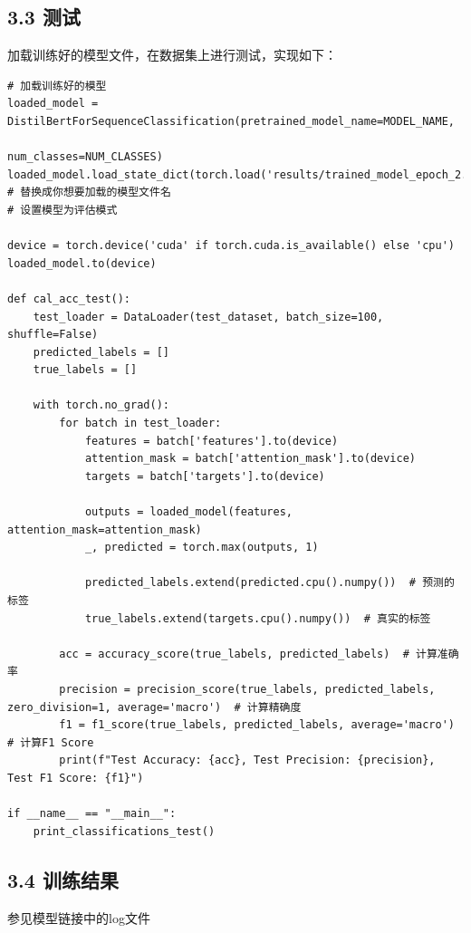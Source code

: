 \documentclass{article}
\begin{document}
\subsection*{3.3 测试}
加载训练好的模型文件，在数据集上进行测试，实现如下：
\begin{lstlisting}[style=Style]
# 加载训练好的模型
loaded_model = DistilBertForSequenceClassification(pretrained_model_name=MODEL_NAME,
                                                   num_classes=NUM_CLASSES)
loaded_model.load_state_dict(torch.load('results/trained_model_epoch_2.pth')) # 替换成你想要加载的模型文件名
# 设置模型为评估模式

device = torch.device('cuda' if torch.cuda.is_available() else 'cpu')
loaded_model.to(device)

def cal_acc_test():
    test_loader = DataLoader(test_dataset, batch_size=100, shuffle=False)
    predicted_labels = []
    true_labels = []

    with torch.no_grad():
        for batch in test_loader:
            features = batch['features'].to(device)
            attention_mask = batch['attention_mask'].to(device)
            targets = batch['targets'].to(device)

            outputs = loaded_model(features, attention_mask=attention_mask)
            _, predicted = torch.max(outputs, 1)

            predicted_labels.extend(predicted.cpu().numpy())  # 预测的标签
            true_labels.extend(targets.cpu().numpy())  # 真实的标签

        acc = accuracy_score(true_labels, predicted_labels)  # 计算准确率
        precision = precision_score(true_labels, predicted_labels, zero_division=1, average='macro')  # 计算精确度
        f1 = f1_score(true_labels, predicted_labels, average='macro')  # 计算F1 Score
        print(f"Test Accuracy: {acc}, Test Precision: {precision}, Test F1 Score: {f1}")

if __name__ == "__main__":
    print_classifications_test()
\end{lstlisting}
\subsection*{3.4 训练结果}
参见模型链接中的log文件
\end{document}
